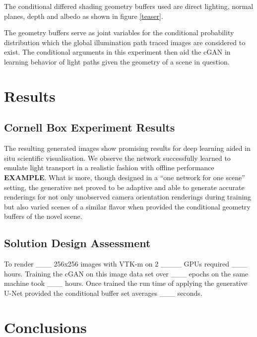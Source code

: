 \documentclass[sigconf,authordraft]{acmart}%
\begin{document}
The conditional differed shading geometry buffers used are direct lighting, normal planes, depth and albedo as shown in figure \ref{teaser}.

The geometry buffers serve as joint variables for the conditional probability distribution which the global illumination path traced images are considered to exist. The conditional arguments in this experiment then aid the cGAN in learning behavior of light paths given the geometry of a scene in question. 

\section{Results}
\subsection{Cornell Box Experiment Results}
The resulting generated images show promising results for deep learning aided in situ scientific visualisation. We observe the network successfully learned to emulate light transport in a realistic fashion with offline performance {\bf EXAMPLE}. What is more, though designed in a ``one network for one scene'' setting, the generative net proved to be adaptive and able to generate accurate renderings for not only unobserved camera orientation renderings during training but also varied scenes of a similar flavor when provided the conditional geometry buffers of the novel scene. 

\subsection{Solution Design Assessment}

To render \_\_\_ 256x256 images with VTK-m on 2 \_\_\_\_ GPUs required \_\_\_ hours. Training the cGAN on this image data set over \_\_\_ epochs on the same machine took \_\_\_ hours. Once trained the run time of applying the generative U-Net provided the conditional buffer set averages \_\_\_ seconds. 

\section{Conclusions}
\end{document}
